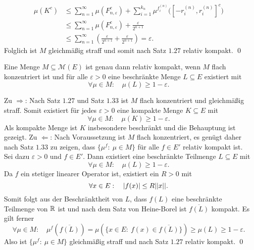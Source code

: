 \begin{proof*}
    \begin{align*}
        \mu(K^c) &\leq \sum_{n=1}^{\infty}\mu(F_{n, \varepsilon}^c) + \sum_{i=1}^{k_n}\mu^{f_i^{(n)}}\big([-r_i^{(n)}, r_i^{(n)}]^c\big) \\\
                 &\leq \sum_{n=1}^{\infty}\mu(F_{n, \varepsilon}^c) + \frac{\varepsilon}{2^{n+1}} \\\
                 &\leq \sum_{n=1}^{\infty}(\frac{\varepsilon}{2^{n+1}} + \frac{\varepsilon}{2^{n+1}}) = \varepsilon. 
    \end{align*}
    Folglich ist $M$ gleichmäßig straff und somit nach Satz $1.27$ relativ kompakt. \qed
\end{proof*}

\begin{corollary}
    Eine Menge $M \subseteq \mathcal{M}(E)$ ist genau dann relativ kompakt, wenn $M$ flach konzentriert ist und für alle $\varepsilon > 0$ eine beschränkte Menge $L \subseteq E$ existiert mit
    $$
        \forall \mu \in M: \quad \mu(L) \geq 1 - \varepsilon. 
    $$
\end{corollary}

\begin{proof*}
    Zu $\Rightarrow$: Nach Satz $1.27$ und Satz $1.33$ ist $M$ flach konzentriert und gleichmäßig straff. Somit existiert für jedes $\varepsilon > 0$ eine kompakte Menge $K \subseteq E$ mit 
    $$
        \forall \mu \in M: \quad \mu(K) \geq 1 - \varepsilon. 
    $$
    Als kompakte Menge ist $K$ insbesondere beschränkt und die Behauptung ist gezeigt.
    \newline  
    Zu $\Leftarrow$: Nach Voraussetzung ist $M$ flach konzentriert, es genügt daher nach Satz $1.33$ zu zeigen, dass $\{\mu^f : \ \mu \in M\}$ für alle $f \in E'$ relativ kompakt ist. Sei dazu $\varepsilon > 0$ und $f \in E'$. 
    Dann existiert eine beschränkte Teilmenge $L \subseteq E$ mit
    $$
        \forall \mu \in M: \quad \mu(L) \geq 1 - \varepsilon.
    $$
    Da $f$ ein stetiger linearer Operator ist, existiert ein $R > 0$ mit 
    $$
        \forall x \in E: \quad \left| f(x) \right| \leq R \lvert\lvert x \rvert\rvert. 
    $$
    Somit folgt aus der Beschränktheit von $L$, dass $f(L)$ eine beschränkte Teilmenge von $\mathbb{R}$ ist und nach dem Satz von Heine-Borel ist $\overline{f(L)}$ kompakt. Es gilt ferner
    $$
        \forall \mu \in M: \quad \mu^f(\overline{f(L)}) = \mu(\{x \in E: \ f(x) \in \overline{f(L)}\}) \geq \mu(L) \geq 1 - \varepsilon. 
    $$
    Also ist $\{\mu^f : \ \mu \in M\}$ gleichmäßig straff und nach Satz $1.27$ relativ kompakt. \qed
\end{proof*}

